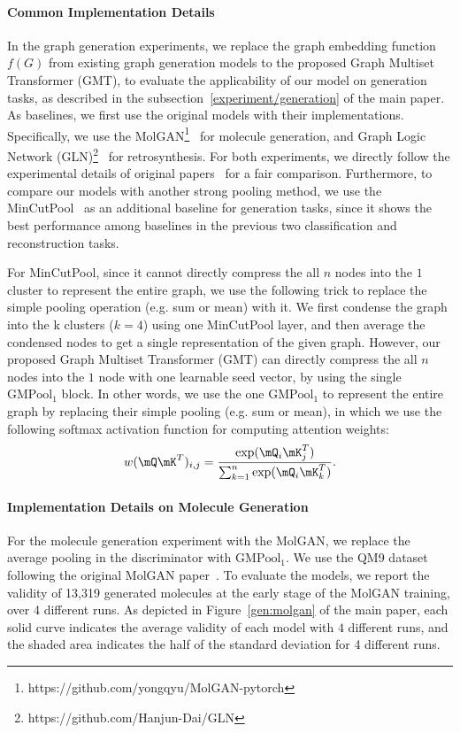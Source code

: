 \paragraph{Common Implementation Details}
In the graph generation experiments, we replace the graph embedding function $f(G)$ from existing graph generation models to the proposed Graph Multiset Transformer (GMT), to evaluate the applicability of our model on generation tasks, as described in the subsection~\ref{experiment/generation} of the main paper. As baselines, we first use the original models with their implementations. Specifically, we use the MolGAN\footnote{https://github.com/yongqyu/MolGAN-pytorch}~\citep{MolGAN} for molecule generation, and Graph Logic Network (GLN)\footnote{https://github.com/Hanjun-Dai/GLN}~\citep{GLN} for retrosynthesis. For both experiments, we directly follow the experimental details of original papers~\citep{MolGAN, GLN} for a fair comparison. Furthermore, to compare our models with another strong pooling method, we use the MinCutPool~\citep{MincutPool} as an additional baseline for generation tasks, since it shows the best performance among baselines in the previous two classification and reconstruction tasks.


For MinCutPool, since it cannot directly compress the all $n$ nodes into the $1$ cluster to represent the entire graph, we use the following trick to replace the simple pooling operation (e.g. sum or mean) with it. We first condense the graph into the k clusters ($k=4$) using one MinCutPool layer, and then average the condensed nodes to get a single representation of the given graph. However, our proposed Graph Multiset Transformer (GMT) can directly compress the all $n$ nodes into the $1$ node with one learnable seed vector, by using the single $\text{GMPool}_1$ block. In other words, we use the one $\text{GMPool}_1$ to represent the entire graph by replacing their simple pooling (e.g. sum or mean), in which we use the following softmax activation function for computing attention weights:
\begin{equation}
    w(\mQ \mK^T)_{i,j} = \frac{\exp(\mQ_i\mK_j^T)}{\sum_{k=1}^n \exp(\mQ_i \mK_k^T)}.
\end{equation}


\paragraph{Implementation Details on Molecule Generation}
For the molecule generation experiment with the MolGAN, we replace the average pooling in the discriminator with $\text{GMPool}_1$. We use the QM9 dataset~\citep{qm9} following the original MolGAN paper~\citep{MolGAN}. To evaluate the models, we report the validity of 13,319 generated molecules at the early stage of the MolGAN training, over 4 different runs. As depicted in Figure~\ref{gen:molgan} of the main paper, each solid curve indicates the average validity of each model with $4$ different runs, and the shaded area indicates the half of the standard deviation for 4 different runs.

